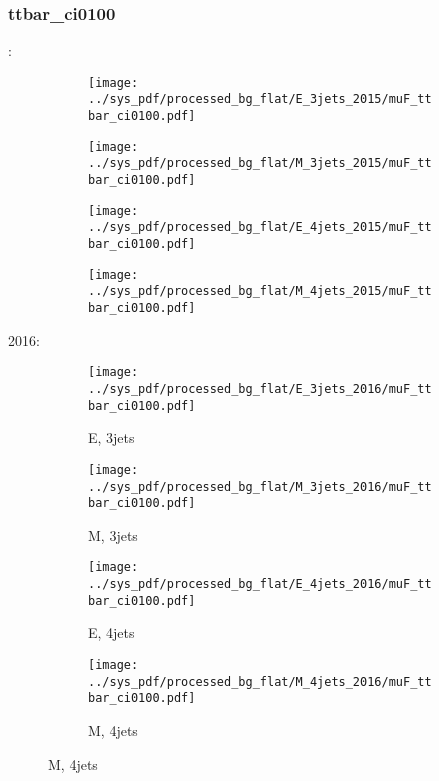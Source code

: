 \documentclass{beamer}
\begin{document}
\begin{frame}
\frametitle{ttbar_ci0100}
\fontsize{5}{1}:
\begin{figure}
\centering
\begin{subfigure}[b]{0.24\textwidth}
\texttt{[image: ../sys\_pdf/processed\_bg\_flat/E\_3jets\_2015/muF\_ttbar\_ci0100.pdf]}
\end{subfigure}
\begin{subfigure}[b]{0.24\textwidth}
\texttt{[image: ../sys\_pdf/processed\_bg\_flat/M\_3jets\_2015/muF\_ttbar\_ci0100.pdf]}
\end{subfigure}
\begin{subfigure}[b]{0.24\textwidth}
\texttt{[image: ../sys\_pdf/processed\_bg\_flat/E\_4jets\_2015/muF\_ttbar\_ci0100.pdf]}
\end{subfigure}
\begin{subfigure}[b]{0.24\textwidth}
\texttt{[image: ../sys\_pdf/processed\_bg\_flat/M\_4jets\_2015/muF\_ttbar\_ci0100.pdf]}
\end{subfigure}
\end{figure}
2016:
\begin{figure}
\centering
\begin{subfigure}[b]{0.24\textwidth}
\texttt{[image: ../sys\_pdf/processed\_bg\_flat/E\_3jets\_2016/muF\_ttbar\_ci0100.pdf]}
\captionsetup{font=tiny}
\caption{E, 3jets}
\end{subfigure}
\begin{subfigure}[b]{0.24\textwidth}
\texttt{[image: ../sys\_pdf/processed\_bg\_flat/M\_3jets\_2016/muF\_ttbar\_ci0100.pdf]}
\captionsetup{font=tiny}
\caption{M, 3jets}
\end{subfigure}
\begin{subfigure}[b]{0.24\textwidth}
\texttt{[image: ../sys\_pdf/processed\_bg\_flat/E\_4jets\_2016/muF\_ttbar\_ci0100.pdf]}
\captionsetup{font=tiny}
\caption{E, 4jets}
\end{subfigure}
\begin{subfigure}[b]{0.24\textwidth}
\texttt{[image: ../sys\_pdf/processed\_bg\_flat/M\_4jets\_2016/muF\_ttbar\_ci0100.pdf]}
\captionsetup{font=tiny}
\caption{M, 4jets}
\end{subfigure}
\end{figure}
\end{frame}
\end{document}
